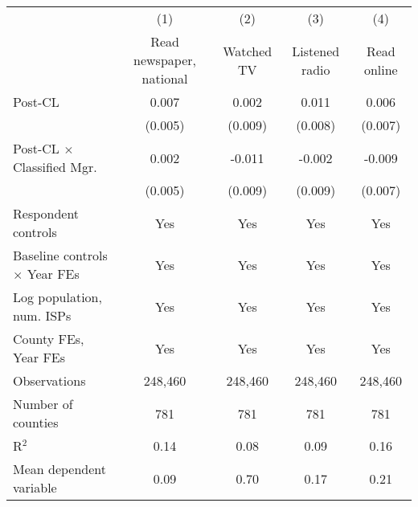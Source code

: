 {
\def\sym#1{\ifmmode^{#1}\else\(^{#1}\)\fi}
\begin{tabular}{l*{4}{c}}
\toprule
                    &\multicolumn{1}{c}{(1)}&\multicolumn{1}{c}{(2)}&\multicolumn{1}{c}{(3)}&\multicolumn{1}{c}{(4)}\\
                    &\multicolumn{1}{c}{Read newspaper, national}&\multicolumn{1}{c}{Watched TV}&\multicolumn{1}{c}{Listened radio}&\multicolumn{1}{c}{Read online}\\
\midrule
Post-CL             &       0.007         &       0.002         &       0.011         &       0.006         \\
                    &     (0.005)         &     (0.009)         &     (0.008)         &     (0.007)         \\
\addlinespace
Post-CL $\times$ Classified Mgr.&       0.002         &      -0.011         &      -0.002         &      -0.009         \\
                    &     (0.005)         &     (0.009)         &     (0.009)         &     (0.007)         \\
\addlinespace
Respondent controls &         Yes         &         Yes         &         Yes         &         Yes         \\
\addlinespace
Baseline controls $\times$ Year FEs &         Yes         &         Yes         &         Yes         &         Yes         \\
\addlinespace
Log population, num. ISPs  &         Yes         &         Yes         &         Yes         &         Yes         \\
\addlinespace
County FEs, Year FEs &         Yes         &         Yes         &         Yes         &         Yes         \\
\midrule
Observations        &     248,460         &     248,460         &     248,460         &     248,460         \\
Number of counties  &         781         &         781         &         781         &         781         \\
R$^2$               &        0.14         &        0.08         &        0.09         &        0.16         \\
Mean dependent variable&        0.09         &        0.70         &        0.17         &        0.21         \\
\bottomrule
\end{tabular}
}
